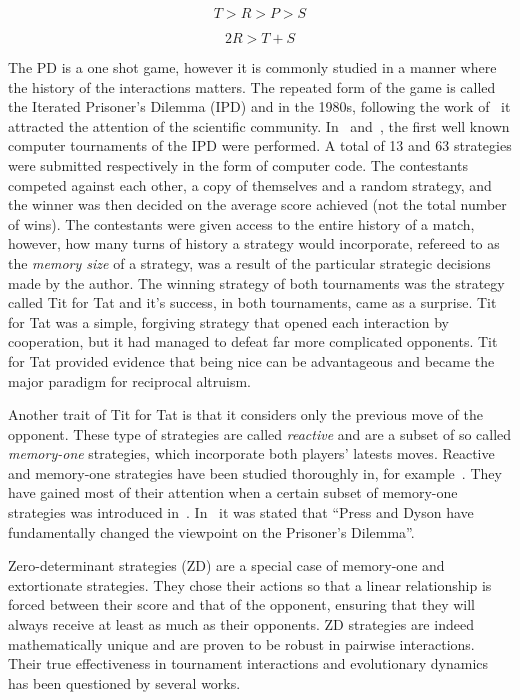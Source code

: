 \documentclass[10pt]{article}
\begin{document}
\begin{equation}\label{eq:pd_constrain_one}
    T > R > P > S
\end{equation}

\begin{equation}\label{eq:pd_constrain_two}
    2R > T + S
\end{equation}

The PD is a one shot game, however it is commonly studied in a manner where the
history of the interactions matters. The repeated form of the game is called the
Iterated Prisoner's Dilemma (IPD) and in the 1980s, following the work
of~\cite{Axelrod1980a, Axelrod1980b} it attracted the attention of the
scientific community. In~\cite{Axelrod1980a} and~\cite{Axelrod1980b}, the first
well known computer tournaments of the IPD were performed. A total of 13 and 63
strategies were submitted respectively in the form of computer code. The
contestants competed against each other, a copy of themselves and a random
strategy, and the winner was then decided on the average score achieved (not the
total number of wins). The contestants were given access to the entire history
of a match, however, how many turns of history a strategy would incorporate,
refereed to as the \textit{memory size} of a strategy, was a result of the
particular strategic decisions made by the author. The winning strategy of both
tournaments was the strategy called Tit for Tat and it's success, in both
tournaments, came as a surprise. Tit for Tat was a simple, forgiving strategy
that opened each interaction by cooperation, but it had managed to defeat far
more complicated opponents. Tit for Tat provided evidence that being nice can be
advantageous and became the major paradigm for reciprocal altruism.

Another trait of Tit for Tat is that it considers only the previous move of the
opponent. These type of strategies are called \textit{reactive} \cite{Nowak1989}
and are a subset of so called \textit{memory-one} strategies, which incorporate
both players' latests moves. Reactive and memory-one strategies have been
studied thoroughly in, for example~\cite{Nowak1990, Nowak1993}. They have gained
most of their attention when a certain subset of memory-one strategies was
introduced in~\cite{Press2012}. In~\cite{Stewart2012} it was stated that ``Press
and Dyson have fundamentally changed the viewpoint on the Prisoner's Dilemma''.

Zero-determinant strategies (ZD) are a special case of memory-one and
extortionate strategies. They chose their actions so that a linear relationship
is forced between their score and that of the opponent, ensuring that they will
always receive at least as much as their opponents. ZD strategies are indeed
mathematically unique and are proven to be robust in pairwise interactions.
Their true effectiveness in tournament interactions and evolutionary
dynamics~\cite{adami2013, Knight2018, Harper2015} has been questioned by several
works.
\end{document}
